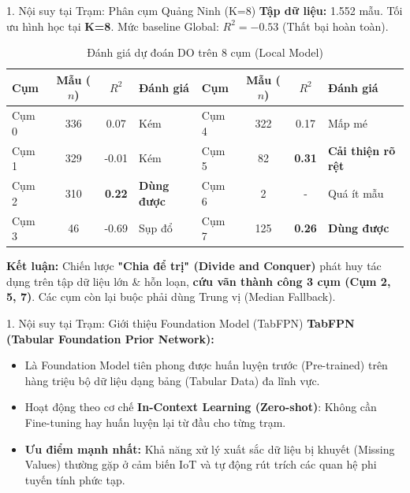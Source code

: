 \documentclass[aspectratio=169]{beamer}
\begin{document}
\begin{frame}{1. Nội suy tại Trạm: Phân cụm Quảng Ninh (K=8)}
    \textbf{Tập dữ liệu:} 1.552 mẫu. Tối ưu hình học tại \textbf{K=8}. Mức baseline Global: $R^2 = -0.53$ (Thất bại hoàn toàn).

    \vspace{0.1cm}
    \begin{table}[]
        \centering
        \caption{Đánh giá dự đoán DO trên 8 cụm (Local Model)}
        \renewcommand{\arraystretch}{1.1}
        \small
        \begin{tabular}{lccl|lccl}
            \toprule
            \textbf{Cụm} & \textbf{Mẫu ($n$)} & \textbf{$R^2$} & \textbf{Đánh giá}  & \textbf{Cụm} & \textbf{Mẫu ($n$)} & \textbf{$R^2$} & \textbf{Đánh giá}         \\
            \midrule
            Cụm 0        & 336                & 0.07           & Kém                & Cụm 4        & 322                & 0.17           & Mấp mé                    \\
            Cụm 1        & 329                & -0.01          & Kém                & Cụm 5        & 82                 & \textbf{0.31}  & \textbf{Cải thiện rõ rệt} \\
            Cụm 2        & 310                & \textbf{0.22}  & \textbf{Dùng được} & Cụm 6        & 2                  & -              & Quá ít mẫu                \\
            Cụm 3        & 46                 & -0.69          & Sụp đổ             & Cụm 7        & 125                & \textbf{0.26}  & \textbf{Dùng được}        \\
            \bottomrule
        \end{tabular}
    \end{table}

    \vspace{0.1cm}
    \textbf{Kết luận:} Chiến lược \textbf{"Chia để trị" (Divide and Conquer)} phát huy tác dụng trên tập dữ liệu lớn \& hỗn loạn, \textbf{cứu vãn thành công 3 cụm (Cụm 2, 5, 7)}. Các cụm còn lại buộc phải dùng Trung vị (Median Fallback).
\end{frame}

\begin{frame}{1. Nội suy tại Trạm: Giới thiệu Foundation Model (TabFPN)}
    \textbf{TabFPN (Tabular Foundation Prior Network):}
    \begin{itemize}
        \item Là Foundation Model tiên phong được huấn luyện trước (Pre-trained) trên hàng triệu bộ dữ liệu dạng bảng (Tabular Data) đa lĩnh vực.
        \item Hoạt động theo cơ chế \textbf{In-Context Learning (Zero-shot)}: Không cần Fine-tuning hay huấn luyện lại từ đầu cho từng trạm.
        \item \textbf{Ưu điểm mạnh nhất:} Khả năng xử lý xuất sắc dữ liệu bị khuyết (Missing Values) thường gặp ở cảm biến IoT và tự động rút trích các quan hệ phi tuyến tính phức tạp.
    \end{itemize}
\end{frame}
\end{document}
